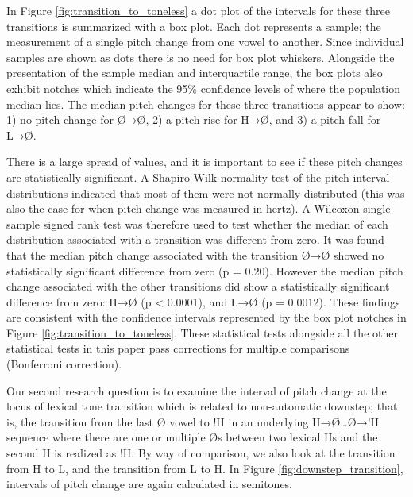 \documentclass[
  11pt,
  b5paper,
]{article}
\begin{document}
In Figure \ref{fig:transition_to_toneless} a dot plot of the intervals
for these three transitions is summarized with a box plot. Each dot
represents a sample; the measurement of a single pitch change from one
vowel to another. Since individual samples are shown as dots there is no
need for box plot whiskers. Alongside the presentation of the sample
median and interquartile range, the box plots also exhibit notches which
indicate the 95\% confidence levels of where the population median lies.
The median pitch changes for these three transitions appear to show: 1)
no pitch change for Ø→Ø, 2) a pitch rise for H→Ø, and 3) a pitch fall
for L→Ø.

There is a large spread of values, and it is important to see if these
pitch changes are statistically significant. A Shapiro-Wilk normality
test of the pitch interval distributions indicated that most of them
were not normally distributed (this was also the case for when pitch
change was measured in hertz). A Wilcoxon single sample signed rank test
was therefore used to test whether the median of each distribution
associated with a transition was different from zero. It was found that
the median pitch change associated with the transition Ø→Ø showed no
statistically significant difference from zero (p = 0.20). However the
median pitch change associated with the other transitions did show a
statistically significant difference from zero: H→Ø (p \textless{}
0.0001), and L→Ø (p = 0.0012). These findings are consistent with the
confidence intervals represented by the box plot notches in Figure
\ref{fig:transition_to_toneless}. These statistical tests alongside all
the other statistical tests in this paper pass corrections for multiple
comparisons (Bonferroni correction).

Our second research question is to examine the interval of pitch change
at the locus of lexical tone transition which is related to
non-automatic downstep; that is, the transition from the last Ø vowel to
!H in an underlying H→Ø\ldots Ø→!H sequence where there are one or
multiple Øs between two lexical Hs and the second H is realized as !H.
By way of comparison, we also look at the transition from H to L, and
the transition from L to H. In Figure \ref{fig:downstep_transition},
intervals of pitch change are again calculated in semitones.
\end{document}
